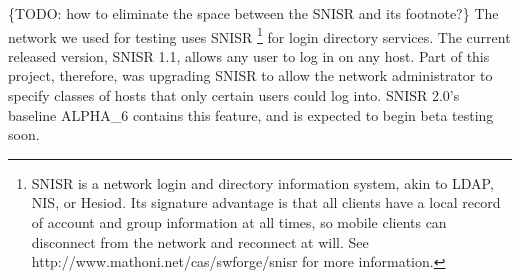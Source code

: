 \{TODO: how to eliminate the space between the SNISR and its footnote?\}
The network we used for testing uses SNISR
\footnote{ SNISR is a network login and directory information system, akin to
LDAP, NIS, or Hesiod.  Its signature advantage is that all clients have a
local record of account and group information at all times, so mobile clients
can disconnect from the network and reconnect at will.  
See http://www.mathoni.net/cas/swforge/snisr for more information. }
%
for login directory services.
%
The current released version, SNISR 1.1, allows any user to log in on any host.
%
Part of this project, therefore, was upgrading SNISR to allow the network
administrator to specify classes of hosts that only certain users could log
into.
%
SNISR 2.0's baseline ALPHA\_6 contains this feature, and is expected to begin
beta testing soon.


